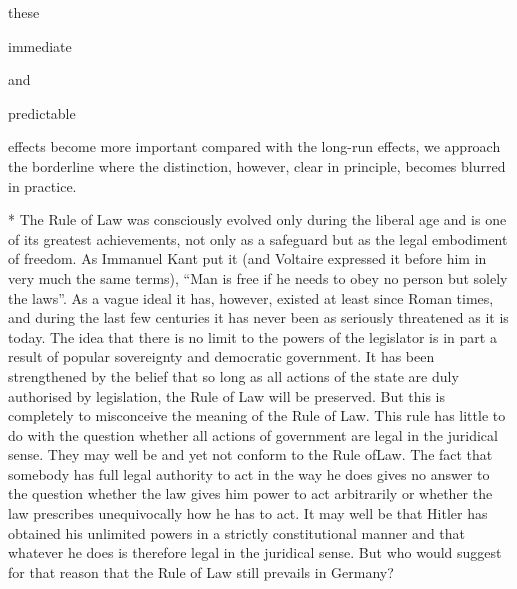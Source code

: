 \documentclass[11pt,openany]{book}
\begin{document}
these

immediate

and

predictable

effects become more important compared with the long-run effects, we approach the borderline where the distinction, however, clear in principle, becomes blurred in practice.

\begin{center}\textasteriskcentered\hspace{0.9em}\textasteriskcentered\hspace{0.9em}\textasteriskcentered\end{center}

\begin{center}\textasteriskcentered\hspace{0.9em}\textasteriskcentered\hspace{0.9em}\textasteriskcentered\end{center}

\begin{center}\textasteriskcentered\hspace{0.9em}\textasteriskcentered\hspace{0.9em}\textasteriskcentered\end{center}

\begin{center}\textasteriskcentered\hspace{0.9em}\textasteriskcentered\hspace{0.9em}\textasteriskcentered\end{center}

* The Rule of Law was consciously evolved only during the liberal age and is one of its greatest achievements, not only as a safeguard but as the legal embodiment of freedom. As Immanuel Kant put it (and Voltaire expressed it before him in very much the same terms), ``Man is free if he needs to obey no person but solely the laws''. As a vague ideal it has, however, existed at least since Roman times, and during the last few centuries it has never been as seriously threatened as it is today. The idea that there is no limit to the powers of the legislator is in part a result of popular sovereignty and democratic government. It has been strengthened by the belief that so long as all actions of the state are duly authorised by legislation, the Rule of Law will be preserved. But this is completely to misconceive the meaning of the Rule of Law. This rule has little to do with the question whether all actions of government are legal in the juridical sense. They may well be and yet not conform to the Rule ofLaw. The fact that somebody has full legal authority to act in the way he does gives no answer to the question whether the law gives him power to act arbitrarily or whether the law prescribes unequivocally how he has to act. It may well be that Hitler has obtained his unlimited powers in a strictly constitutional manner and that whatever he does is therefore legal in the juridical sense. But who would suggest for that reason that the Rule of Law still prevails in Germany?
\end{document}
